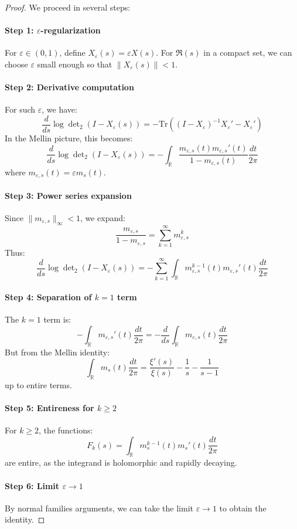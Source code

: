 \documentclass[11pt]{article}
\theoremstyle{plain}
\theoremstyle{remark}
\newcommand{\R}{\mathbb{R}}
\newcommand{\Tr}{\mathrm{Tr}}
\newcommand{\dettwo}{\det\nolimits_2}
\begin{document}
\begin{proof}
We proceed in several steps:

\paragraph{Step 1: $\varepsilon$-regularization}
For $\varepsilon \in (0,1)$, define $X_\varepsilon(s) = \varepsilon X(s)$. For $\Re(s)$ in a compact set, we can choose $\varepsilon$ small enough so that $\|X_\varepsilon(s)\| < 1$.

\paragraph{Step 2: Derivative computation}
For such $\varepsilon$, we have:
\[
\frac{d}{ds} \log \dettwo(I - X_\varepsilon(s)) = -\Tr\left((I - X_\varepsilon)^{-1} X_\varepsilon' - X_\varepsilon'\right)
\]
In the Mellin picture, this becomes:
\[
\frac{d}{ds} \log \dettwo(I - X_\varepsilon(s)) = -\int_{\R} \frac{m_{\varepsilon,s}(t) m_{\varepsilon,s}'(t)}{1 - m_{\varepsilon,s}(t)} \frac{dt}{2\pi}
\]
where $m_{\varepsilon,s}(t) = \varepsilon m_s(t)$.

\paragraph{Step 3: Power series expansion}
Since $\|m_{\varepsilon,s}\|_\infty < 1$, we expand:
\[
\frac{m_{\varepsilon,s}}{1 - m_{\varepsilon,s}} = \sum_{k=1}^\infty m_{\varepsilon,s}^k
\]
Thus:
\[
\frac{d}{ds} \log \dettwo(I - X_\varepsilon(s)) = -\sum_{k=1}^\infty \int_{\R} m_{\varepsilon,s}^{k-1}(t) m_{\varepsilon,s}'(t) \frac{dt}{2\pi}
\]

\paragraph{Step 4: Separation of $k=1$ term}
The $k=1$ term is:
\[
-\int_{\R} m_{\varepsilon,s}'(t) \frac{dt}{2\pi} = -\frac{d}{ds} \int_{\R} m_{\varepsilon,s}(t) \frac{dt}{2\pi}
\]
But from the Mellin identity:
\[
\int_{\R} m_s(t) \frac{dt}{2\pi} = \frac{\xi'(s)}{\xi(s)} - \frac{1}{s} - \frac{1}{s-1}
\]
up to entire terms.

\paragraph{Step 5: Entireness for $k \geq 2$}
For $k \geq 2$, the functions:
\[
F_k(s) = \int_{\R} m_s^{k-1}(t) m_s'(t) \frac{dt}{2\pi}
\]
are entire, as the integrand is holomorphic and rapidly decaying.

\paragraph{Step 6: Limit $\varepsilon \to 1$}
By normal families arguments, we can take the limit $\varepsilon \to 1$ to obtain the identity.
\end{proof}
\end{document}
